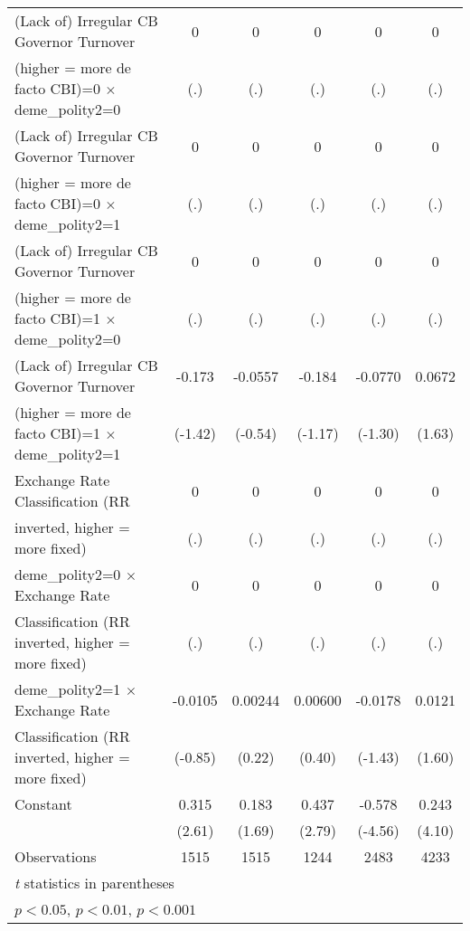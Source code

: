 {\begin{tabular}{l*{5}{c}}
\addlinespace
(Lack of) Irregular CB Governor Turnover&    0         &    0         &    0         &    0         &    0         \\
(higher = more de facto CBI)=0 $\times$ deme\_polity2=0&  (.)         &  (.)         &  (.)         &  (.)         &  (.)         \\
\addlinespace
(Lack of) Irregular CB Governor Turnover&    0         &    0         &    0         &    0         &    0         \\
(higher = more de facto CBI)=0 $\times$ deme\_polity2=1&  (.)         &  (.)         &  (.)         &  (.)         &  (.)         \\
\addlinespace
(Lack of) Irregular CB Governor Turnover&    0         &    0         &    0         &    0         &    0         \\
(higher = more de facto CBI)=1 $\times$ deme\_polity2=0&  (.)         &  (.)         &  (.)         &  (.)         &  (.)         \\
\addlinespace
(Lack of) Irregular CB Governor Turnover&-0.173         &-0.0557         &-0.184         &-0.0770         &0.0672         \\
(higher = more de facto CBI)=1 $\times$ deme\_polity2=1&(-1.42)         &(-0.54)         &(-1.17)         &(-1.30)         &(1.63)         \\
\addlinespace
Exchange Rate Classification (RR        &    0         &    0         &    0         &    0         &    0         \\
inverted, higher = more fixed)          &  (.)         &  (.)         &  (.)         &  (.)         &  (.)         \\
\addlinespace
deme\_polity2=0 $\times$ Exchange Rate   &    0         &    0         &    0         &    0         &    0         \\
Classification (RR inverted, higher = more fixed)&  (.)         &  (.)         &  (.)         &  (.)         &  (.)         \\
\addlinespace
deme\_polity2=1 $\times$ Exchange Rate   &-0.0105         &0.00244         &0.00600         &-0.0178         &0.0121         \\
Classification (RR inverted, higher = more fixed)&(-0.85)         &(0.22)         &(0.40)         &(-1.43)         &(1.60)         \\
\addlinespace
Constant                                &0.315\sym{*}  &0.183         &0.437\sym{**} &-0.578\sym{***}&0.243\sym{***}\\
                                        &(2.61)         &(1.69)         &(2.79)         &(-4.56)         &(4.10)         \\
\midrule
Observations                            & 1515         & 1515         & 1244         & 2483         & 4233         \\
\bottomrule
\multicolumn{6}{l}{\footnotesize \textit{t} statistics in parentheses}\\
\multicolumn{6}{l}{\footnotesize \sym{*} \(p<0.05\), \sym{**} \(p<0.01\), \sym{***} \(p<0.001\)}\\
\end{tabular}
}
